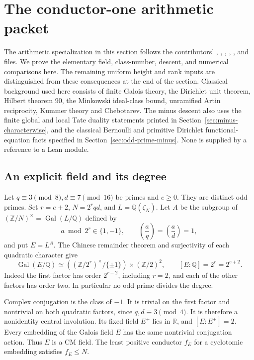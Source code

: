 \section{The conductor-one arithmetic packet}\label{sec:sr-arithmetic}
The arithmetic specialization in this section follows the contributors'
, ,
, ,
, and  files.
We prove the elementary field, class-number, descent, and numerical
comparisons here. The remaining uniform height and rank inputs are
distinguished from these consequences at the end of the section.
Classical background used here consists of finite Galois theory,
the Dirichlet unit theorem, Hilbert theorem 90, the Minkowski ideal-class
bound, unramified Artin reciprocity, Kummer theory and Chebotarev.
The minus descent also uses the finite global and local Tate duality
statements printed in Section~\ref{sec:minus-characterwise}, and the
classical Bernoulli and primitive Dirichlet functional-equation facts
specified in Section~\ref{sec:odd-prime-minus}.
None is supplied by a reference to a Lean module.

\subsection{An explicit field and its degree}
Let \(q\equiv3\pmod8,d\equiv7\pmod{16}\) be primes and \(e\geq0\).
They are distinct odd primes. Set \(r=e+2\), \(N=2^rqd\), and
\(L=\mathbb Q(\zeta_N)\). Let \(A\) be the subgroup of
\((\mathbb Z/N)^\times=\operatorname{Gal}(L/\mathbb Q)\) defined by
\[
 a\bmod2^r\in\{1,-1\},\qquad
 \left(\frac aq\right)=\left(\frac ad\right)=1,
\]
and put \(E=L^A\).
The Chinese remainder theorem and surjectivity of each quadratic character
give
\[
 \operatorname{Gal}(E/\mathbb Q)\simeq
 ((\mathbb Z/2^r)^\times/\{\pm1\})\times(\mathbb Z/2)^2,\qquad
 [E:\mathbb Q]=2^r=2^{e+2}.
\]
Indeed the first factor has order \(2^{r-2}\), including \(r=2\),
and each of the other factors has order two.
In particular no odd prime divides the degree.

Complex conjugation is the class of \(-1\).
It is trivial on the first factor and nontrivial on both quadratic
factors, since \(q,d\equiv3\pmod4\).
It is therefore a nonidentity central involution.
Its fixed field \(E^+\) lies in \(\mathbb R\), and
\([E:E^+]=2\). Every embedding of the Galois field \(E\) has the same
nontrivial conjugation action. Thus \(E\) is a CM field.
The least positive conductor \(f_E\) for a cyclotomic embedding
satisfies \(f_E\leq N\).

